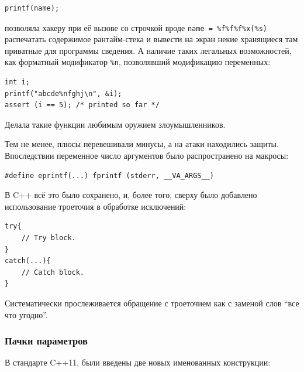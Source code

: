 \documentclass[a4paper,12pt,oneside]{article}
\begin{document}
\begin{lstlisting}
printf(name);
\end{lstlisting}

позволяла хакеру при её вызове со строчкой вроде \lstinline!name = %f%f%f%x(%s)! распечатать содержимое рантайм-стека и вывести на экран некие хранящиеся там приватные для программы сведения. А наличие таких легальных возможностей, как форматный модификатор \lstinline!%n!, позволявший модификацию переменных:

\begin{lstlisting}
int i;
printf("abcde%nfghj\n", &i);
assert (i == 5); /* printed so far */
\end{lstlisting}

Делала такие функции любимым оружием злоумышленников. 

Тем не менее, плюсы перевешивали минусы, а на атаки находились защиты. Впоследствии переменное число аргументов было распространено на макросы:

\begin{lstlisting}
#define eprintf(...) fprintf (stderr, __VA_ARGS__)
\end{lstlisting}

В C++ всё это было сохранено, и, более того, сверху было добавлено использование троеточия в обработке исключений:

\begin{lstlisting}
try{
    // Try block.
}
catch(...){
    // Catch block.
}
\end{lstlisting}

Систематически прослеживается обращение с троеточием как с заменой слов ``все что угодно''.

\subsubsection{Пачки параметров}\label{ParamPack}

В стандарте C++11, были введены две новых именованных конструкции: 
\end{document}
